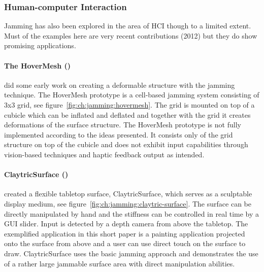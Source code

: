 \subsubsection{Human-computer Interaction}
\label{ch:jamming:related-work:hci}
Jamming has also been explored in the area of HCI though to a limited extent.
Must of the examples here are very recent contributions (2012) but they do show promising applications.

\paragraph{The HoverMesh (\citeyear{mazzone2004hovermesh})}
\label{ch:jamming:related-work:hci:hovermesh}
\citet{mazzone2004hovermesh} did some early work on creating a deformable structure with the jamming technique. 
The HoverMesh prototype is a cell-based jamming system consisting of 3x3 grid, see figure~\ref{fig:ch:jamming:hovermesh}.
The grid is mounted on top of a cubicle which can be inflated and deflated and together with the grid it creates deformations of the surface structure.
The HoverMesh prototype is not fully implemented according to the ideas presented.
It consists only of the grid structure on top of the cubicle and does not exhibit input capabilities through vision-based techniques and haptic feedback output as intended. 

\paragraph{ClaytricSurface (\citeyear{matoba2012claytricsurface})}
\label{ch:jamming:related-work:hci:claytric}
\citet{matoba2012claytricsurface} created a flexible tabletop surface, ClaytricSurface, which serves as a sculptable display medium, see figure~\ref{fig:ch:jamming:claytric-surface}. 
The surface can be directly manipulated by hand and the stiffness can be controlled in real time by a GUI slider.
Input is detected by a depth camera from above the tabletop.
The exemplified application in this short paper is a painting application projected onto the surface from above and a user can use direct touch on the surface to draw. 
ClaytricSurface uses the basic jamming approach and demonstrates the use of a rather large jammable surface area with direct manipulation abilities.

